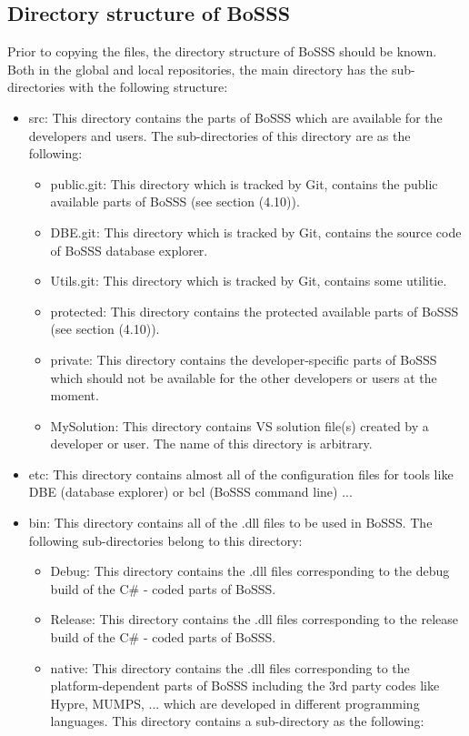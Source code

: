 \documentclass[11pt,twoside,a4paper]{fdyartcl}
\begin{document}
\subsection{Directory structure of BoSSS}
 Prior to copying the files, the directory structure of BoSSS should be known. Both in the global and local repositories, the main directory has the sub-directories with the following structure:
\begin{itemize}
\item src: This directory contains the parts of BoSSS which are available for the developers and users. The sub-directories of this directory are as the following:
    \begin{itemize}
    \item public.git: This directory which is tracked by Git, contains the public available parts of BoSSS (see section (4.10)).
    \item DBE.git: This directory which is tracked by Git, contains the source code of BoSSS database explorer.
    \item Utils.git: This directory which is tracked by Git, contains some utilitie.
    \item protected: This directory contains the protected available parts of BoSSS (see section (4.10)).
    \item private: This directory contains the developer-specific parts of BoSSS which should not be available for the other developers or users at the moment.
    \item MySolution: This directory contains VS solution file(s) created by a developer or user. The name of this directory is arbitrary.
    \end{itemize}
\item etc: This directory contains almost all of the configuration files for tools like DBE (database explorer) or bcl (BoSSS command line) ...
\item bin: This directory contains all of the .dll files to be used in BoSSS. The following sub-directories belong to this directory:
    \begin{itemize}
    \item Debug: This directory contains the {\scriptsize .dll} files corresponding to the debug build of the C\# - coded parts of BoSSS.
    \item Release: This directory contains the {\scriptsize .dll} files corresponding to the release build of the C\# - coded parts of BoSSS.
    \item native: This directory contains the {\scriptsize .dll} files corresponding to the platform-dependent parts of BoSSS including the 3rd party codes like Hypre, MUMPS, ... which are developed in different programming languages. This directory contains a sub-directory as the following:

\end{itemize}
\end{itemize}
\end{document}
